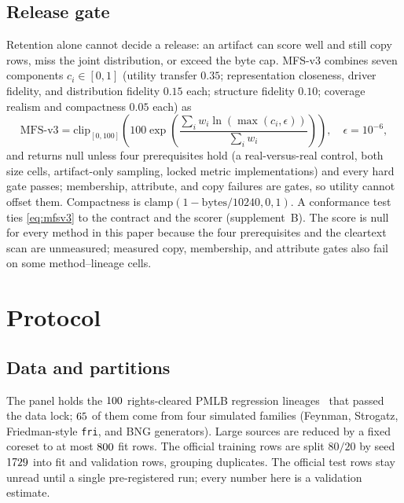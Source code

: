 \documentclass{article} %
\begin{document}
\subsection{Release gate}
\label{sec:gate}
Retention alone cannot decide a release: an artifact can score well and still copy rows, miss the joint distribution, or exceed the byte cap. MFS-v3 combines seven components $c_i\in[0,1]$ (utility transfer $0.35$; representation closeness, driver fidelity, and distribution fidelity $0.15$ each; structure fidelity $0.10$; coverage realism and compactness $0.05$ each) as
\begin{equation}
\label{eq:mfsv3}
\mathrm{MFS\text{-}v3}
= \mathrm{clip}_{[0,100]}\!\left(
100\exp\!\left(\frac{\sum_i w_i\ln(\max(c_i,\epsilon))}{\sum_i w_i}\right)
\right),\quad \epsilon = 10^{-6},
\end{equation}
and returns null unless four prerequisites hold (a real-versus-real control, both size cells, artifact-only sampling, locked metric implementations) and every hard gate passes; membership, attribute, and copy failures are gates, so utility cannot offset them. Compactness is $\mathrm{clamp}(1-\mathrm{bytes}/10240,0,1)$. A conformance test ties \eqref{eq:mfsv3} to the contract and the scorer (supplement~B). The score is null for every method in this paper because the four prerequisites and the cleartext scan are unmeasured; measured copy, membership, and attribute gates also fail on some method--lineage cells.

\section{Protocol}
\label{sec:protocol}
\subsection{Data and partitions}
The panel holds the $100$ rights-cleared PMLB regression lineages~\citep{olson2017pmlb,romano2021pmlb} that passed the data lock; $65$ of them come from four simulated families (Feynman, Strogatz, Friedman-style \texttt{fri}, and BNG generators). Large sources are reduced by a fixed coreset to at most $800$ fit rows. The official training rows are split $80/20$ by seed $1729$ into fit and validation rows, grouping duplicates. The official test rows stay unread until a single pre-registered run; every number here is a validation estimate.
\end{document}
